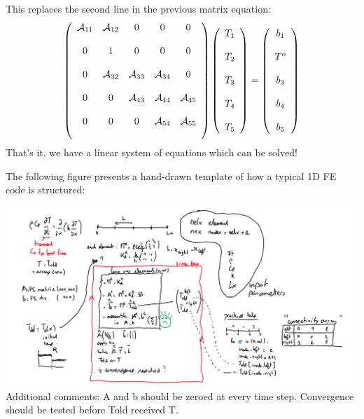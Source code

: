 This replaces the second line in the previous matrix equation:
\[
\left(
\begin{array}{ccccc}
{\cal A}_{11} & {\cal A}_{12} & 0& 0& 0\\ \\
0 & 1 & 0 & 0 & 0 \\ \\
0 & {\cal A}_{32} & {\cal A}_{33}&  {\cal A}_{34} & 0 \\\\
0&0&   {\cal A}_{43} & {\cal A}_{44}&  {\cal A}_{45} \\\\
0&0&0   & {\cal A}_{54}&  {\cal A}_{55} \\\\
\end{array}
\right)
\left(
\begin{array}{c}
T_1 \\\\ T_2 \\\\ T_3 \\\\ T_4 \\\\ T_5
\end{array}
\right)
=
\left(
\begin{array}{c}
b_{1} \\ \\
T^{o} \\ \\
b_{3}\\\\
b_{4}\\\\
b_{5}
\end{array}
\right)
\]
That's it, we have a linear system of equations which can be solved!


The following figure presents a hand-drawn template of how 
a typical 1D FE code is structured:
\begin{center}
\includegraphics[width=16cm]{images/fem_exercises/FEMcode_structure}\\
{\captionfont Additional comments: A and b should be zeroed at every time step.
Convergence should be tested before Told received T.}
\end{center}




